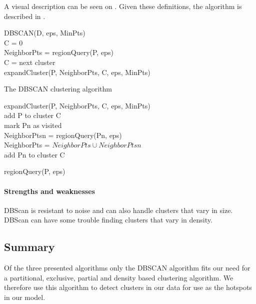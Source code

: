 A visual description can be seen on .
Given these definitions, the algorithm is described in .

\begin{algorithm}
DBSCAN(D, eps, MinPts)\\
	C = 0\\
	{
		NeighborPts = regionQuery(P, eps)\\
		{
			C = next cluster\\
			expandCluster(P, NeighborPts, C, eps, MinPts)
		}
	}
\caption{The DBSCAN clustering algorithm}\label{dbscan-algo}
\end{algorithm}

\begin{algorithm}
expandCluster(P, NeighborPts, C, eps, MinPts)\\
	add P to cluster C\\
	{
		{
			mark Pn as visited\\
			NeighborPtsn = regionQuery(Pn, eps)\\
		}
		{
			NeighborPts = $ NeighborPts \cup NeighborPtsn $\\
			{add Pn to cluster C\\}
		}
	}
\end{algorithm}

\begin{algorithm}
regionQuery(P, eps)\\
\end{algorithm}
\paragraph{Strengths and weaknesses}
DBScan is resistant to noise and can also handle clusters that vary in size.
DBScan can have some trouble finding clusters that vary in density.

\subsection{Summary} Of the three presented algorithms only the DBSCAN algorithm fits our need for a partitional, exclusive, partial and density based clustering algorithm.
We therefore use this algorithm to detect clusters in our data for use as the hotspots in our model.
